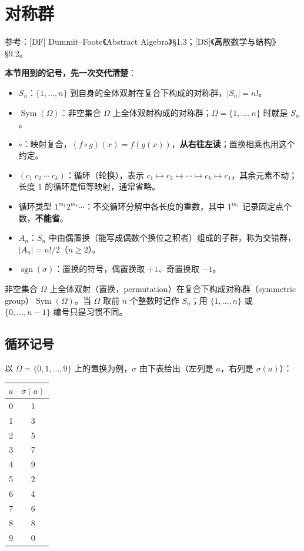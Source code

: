 \section{对称群}


参考：[DF] Dummit–Foote《Abstract Algebra》§1.3；[DS]《离散数学与结构》§9.2。

\textbf{本节用到的记号，先一次交代清楚}：

\begin{itemize}
\item $S_n$：$\{1,\dots,n\}$ 到自身的全体双射在复合下构成的对称群，$|S_n|=n!$。
\item $\operatorname{Sym}(\Omega)$：非空集合 $\Omega$ 上全体双射构成的对称群；$\Omega=\{1,\dots,n\}$ 时就是 $S_n$。
\item $\circ$：映射复合，$(f\circ g)(x)=f(g(x))$，\textbf{从右往左读}；置换相乘也用这个约定。
\item $(c_1\ c_2\ \cdots\ c_k)$：循环（轮换），表示 $c_1\mapsto c_2\mapsto\cdots\mapsto c_k\mapsto c_1$，其余元素不动；长度 $1$ 的循环是恒等映射，通常省略。
\item 循环类型 $1^{m_1}2^{m_2}\cdots$：不交循环分解中各长度的重数，其中 $1^{m_1}$ 记录固定点个数，\textbf{不能省}。
\item $A_n$：$S_n$ 中由偶置换（能写成偶数个换位之积者）组成的子群，称为交错群，$|A_n|=n!/2$（$n\ge2$）。
\item $\operatorname{sgn}(\sigma)$：置换的符号，偶置换取 $+1$、奇置换取 $-1$。
\end{itemize}


非空集合 $\Omega$ 上全体双射（置换，permutation）在复合下构成对称群（symmetric group）$\operatorname{Sym}(\Omega)$。当 $\Omega$ 取前 $n$ 个整数时记作 $S_n$；用 $\{1,\ldots,n\}$ 或 $\{0,\ldots,n-1\}$ 编号只是习惯不同。

\subsection{循环记号}


以 $\Omega=\{0,1,\ldots,9\}$ 上的置换为例，$\sigma$ 由下表给出（左列是 $a$，右列是 $\sigma(a)$）：


\begin{center}
\begin{tabular}{cc}
$a$ & $\sigma(a)$\\ \hline
0 & 1\\
1 & 3\\
2 & 5\\
3 & 7\\
4 & 9\\
5 & 2\\
6 & 4\\
7 & 6\\
8 & 8\\
9 & 0
\end{tabular}
\end{center}



